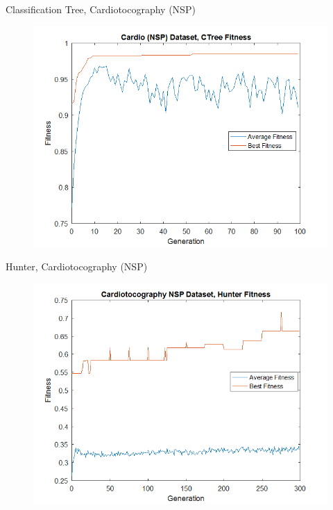 \documentclass{beamer}
\begin{document}
\begin{frame} {Classification Tree, Cardiotocography (NSP)}
	\begin{figure}
		\centering
		\includegraphics[width=.95\linewidth]{figures/png/fitnessCardioNSPCTree}
		\label{fig:fitnessCardioNSPCtree}
	\end{figure}
	
\end{frame}

\begin{frame} {Hunter, Cardiotocography (NSP)}
	\begin{figure}
		\centering
		\includegraphics[width=.95\linewidth]{figures/png/fitnessCardioNSPHunter}
		\label{fig:fitnesscardionsphunter}
	\end{figure}
	
\end{frame}
\end{document}
